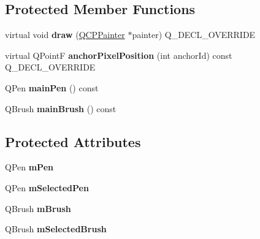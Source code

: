 \subsection*{Protected Member Functions}
\begin{DoxyCompactItemize}
\item 
\mbox{\label{class_q_c_p_item_rect_a3c492960d0fc038cf1b60578b62b6cdc}} 
virtual void {\bfseries draw} (\hyperlink{class_q_c_p_painter}{Q\+C\+P\+Painter} $\ast$painter) Q\+\_\+\+D\+E\+C\+L\+\_\+\+O\+V\+E\+R\+R\+I\+DE
\item 
\mbox{\label{class_q_c_p_item_rect_a844027325b33a3b7eef424128ee5109c}} 
virtual Q\+PointF {\bfseries anchor\+Pixel\+Position} (int anchor\+Id) const Q\+\_\+\+D\+E\+C\+L\+\_\+\+O\+V\+E\+R\+R\+I\+DE
\item 
\mbox{\label{class_q_c_p_item_rect_af94d87da501e9429c0e874f1c0369b03}} 
Q\+Pen {\bfseries main\+Pen} () const
\item 
\mbox{\label{class_q_c_p_item_rect_a8813d2d670835ac9b8000c981b8ea6fe}} 
Q\+Brush {\bfseries main\+Brush} () const
\end{DoxyCompactItemize}
\subsection*{Protected Attributes}
\begin{DoxyCompactItemize}
\item 
\mbox{\label{class_q_c_p_item_rect_aa0d49323628d6752026056bfb52afd86}} 
Q\+Pen {\bfseries m\+Pen}
\item 
\mbox{\label{class_q_c_p_item_rect_a73cc0bee61de3c67221ec8c7a76a29ed}} 
Q\+Pen {\bfseries m\+Selected\+Pen}
\item 
\mbox{\label{class_q_c_p_item_rect_a2d7f207fada27588b3a52b19234d3c2e}} 
Q\+Brush {\bfseries m\+Brush}
\item 
\mbox{\label{class_q_c_p_item_rect_a21b70eee59b6e19ae0bbdf037b13508f}} 
Q\+Brush {\bfseries m\+Selected\+Brush}
\end{DoxyCompactItemize}
